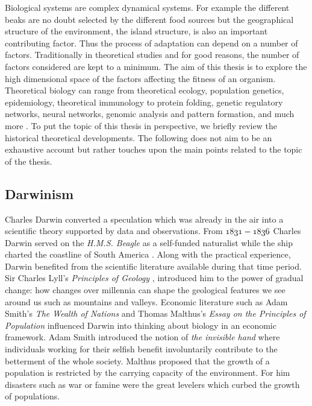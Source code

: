 \documentclass[oneside,11pt,a4paper]{book}
\begin{document}
Biological systems are complex dynamical systems.
For example the different beaks are no doubt selected by the different food sources but the geographical structure of the environment, the island structure, is also an important contributing factor.
Thus the process of adaptation can depend on a number of factors.
Traditionally in theoretical studies and for good reasons, the number of factors considered are kept to a minimum.
The aim of this thesis is to explore the high dimensional space of the factors affecting the fitness of an organism.
Theoretical biology can range from theoretical ecology, population genetics, epidemiology, theoretical immunology to protein folding, genetic regulatory networks, neural networks, genomic analysis and pattern formation, and much more \citep{nowak:2006bo}.
To put the topic of this thesis in perspective, we briefly review the historical theoretical developments.
The following does not aim to be an exhaustive account but rather touches upon the main points related to the topic of the thesis.

\subsection{Darwinism}

Charles Darwin converted a speculation which was already in the air into a scientific theory supported by data and observations.
From $\oldstylenums{1831}-\oldstylenums{1836}$ Charles Darwin served on the \textit{H.M.S. Beagle} as a self-funded naturalist while the ship charted the coastline of South America \citep{darwinlett:1931lt}.
Along with the practical experience, Darwin benefited from the scientific literature available during that time period.
Sir Charles Lyll's \textit{Principles of Geology} \citep{lyell:1830bo}, introduced him to the power of gradual change:
how changes over millennia can shape the geological features we see around us such as mountains and valleys.
Economic literature such as Adam Smith's \textit{The Wealth of Nations} \citep{smith:1776le} and Thomas Malthus's \textit{Essay on the Principles of Population} \citep{malthus:1798bo,malthus:1826bo} influenced Darwin into thinking about biology in an economic framework.
Adam Smith introduced the notion of \textit{the invisible hand} where individuals working for their selfish benefit involuntarily contribute to the betterment of the whole society.
Malthus proposed that the growth of a population is restricted by the carrying capacity of the environment.
For him disasters such as war or famine were the great levelers which curbed the growth of populations.
\end{document}
